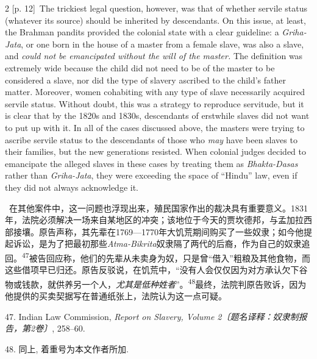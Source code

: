 \documentclass[10pt,a4paper]{article}
\begin{document}
\begin{paracol}{2}
\switchcolumn
{\scriptsize\color{gray} [p. 12]}\ The trickiest legal question, however, was that of whether servile status (whatever its source) should be inherited by descendants. On this issue, at least, the Brahman pandits provided the colonial state with a clear guideline: a \textit{Griha-Jata}, or one born in the house of a master from a female slave, was also a slave, and \textit{could not be emancipated without the will of the master.} The definition was extremely wide because the child did not need to be of the master to be considered a slave, nor did the type of slavery ascribed to the child’s father matter. Moreover, women cohabiting with any type of slave necessarily acquired servile status. Without doubt, this was a strategy to reproduce servitude, but it is clear that by the 1820s and 1830s, descendants of erstwhile slaves did not want to put up with it. In all of the cases discussed above, the masters were trying to ascribe servile status to the descendants of those who \textit{may} have been slaves to their families, but the new generations resisted. When colonial judges decided to emancipate the alleged slaves in these cases by treating them as \textit{Bhakta-Dasas} rather than \textit{Griha-Jata}, they were exceeding the space of “Hindu” law, even if they did not always acknowledge it.\par
\switchcolumn*
{\scriptsize\color{gray} [p. 12]}\ 在其他案件中，这一问题也浮现出来，殖民国家作出的裁决具有重要意义。1831年，法院必须解决一场来自某地区的冲突；该地位于今天的贾坎德邦，与孟加拉西部接壤。原告声称，其先辈在1769—1770年大饥荒期间购买了一些奴隶；如今他提起诉讼，是为了把最初那些\textit{Atma-Bikrita}奴隶隔了两代的后裔，作为自己的奴隶追\mbox{回。\textsuperscript{47}}被告回应称，他们的先辈从未卖身为奴，只是曾“借入”粗粮及其他食物，而这些借项早已归还。原告反驳说，在饥荒中，“没有人会仅仅因为对方承认欠下谷物或钱款，就供养另一个人，\textit{尤其是低种姓者}”。\nobreak\textsuperscript{48}最终，法院判原告败诉，因为他提供的买卖契据写在普通纸张上，法院认为这一点可疑。\par{\small 47. Indian Law Commission, \textit{Report on Slavery, Volume 2〔题名译释：奴隶制报告，第2卷〕}, 258–60.\par}{\small 48. 同上, 着重号为本文作者所加.\par}
\switchcolumn

\end{paracol}
\end{document}
